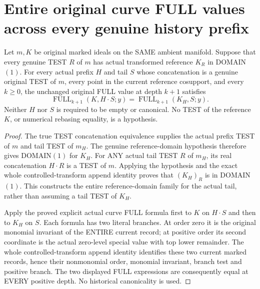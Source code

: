 \section{Entire original curve FULL values across every genuine history prefix}

\begin{theorem}
\label{hir:original-modeled-curve-full-arbitrary-prefix-rebase}
\leanok
Let $m,K$ be original marked ideals on the SAME ambient manifold. Suppose
that every genuine TEST $R$ of $m$ has actual transformed reference $K_R$
in DOMAIN$(1)$. For every actual prefix $H$ and tail $S$ whose concatenation
is a genuine original TEST of $m$, every point in the current reference
cosupport, and every $k\ge0$, the unchanged original FULL value at depth
$k+1$ satisfies
\[
 \operatorname{FULL}_{k+1}(K,H\mathbin{\cdot}S;y)
 =\operatorname{FULL}_{k+1}(K_H,S;y).
\]
Neither $H$ nor $S$ is required to be empty or canonical. No TEST of the
reference $K$, or numerical rebasing equality, is a hypothesis.
\end{theorem}
\begin{proof}
The true TEST concatenation equivalence supplies the actual prefix TEST
of $m$ and tail TEST of $m_H$. The genuine reference-domain hypothesis
therefore gives DOMAIN$(1)$ for $K_H$. For ANY actual tail TEST $R$ of
$m_H$, its real concatenation $H\mathbin{\cdot}R$ is a TEST of $m$.
Applying the hypothesis and the exact whole controlled-transform append
identity proves that $(K_H)_R$ is in DOMAIN$(1)$. This constructs the
entire reference-domain family for the actual tail, rather than assuming
a tail TEST of $K_H$.

Apply the proved explicit actual curve FULL formula first to $K$ on
$H\mathbin{\cdot}S$ and then to $K_H$ on $S$. Each formula has two literal
branches. At order zero it is the original monomial invariant of the
ENTIRE current record; at positive order its second coordinate is the
actual zero-level special value with top lower remainder. The whole
controlled-transform append identity identifies these two current marked
records, hence their nonmonomial order, monomial invariant, branch test
and positive branch. The two displayed FULL expressions are consequently
equal at EVERY positive depth. No historical canonicality is used.
\end{proof}

